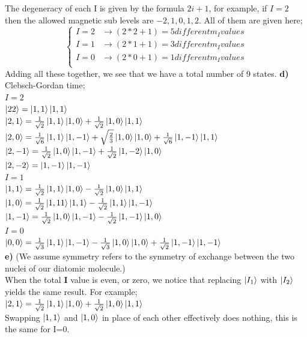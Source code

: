 \documentclass[12pt]{article}
\begin{document}
The degeneracy of each I is given by the formula $2i+1$, for example, if $I=2$ then the allowed magnetic sub levels are $-2,1,0,1,2$. All of them are given here;\\
\[
\begin{cases}
I=2 & \rightarrow(2*2+1)=5 different m_I values\\
I=1 & \rightarrow(2*1+1)=3 different m_I values\\
I=0 & \rightarrow(2*0+1)=1 different m_I values\\
\end{cases}
\]
Adding all these together, we see that we have a total number of 9 states. 
\textbf{d) } Clebsch-Gordan time;\\
$I=2$\\
$\ket{2 2}=\ket{1,1}\ket{1,1}$\\
$\ket{2,1}=\frac{1}{\sqrt{2}}\ket{1,1}\ket{1,0}+\frac{1}{\sqrt2}\ket{1,0}\ket{1,1}$\\
$\ket{2,0}=\frac{1}{\sqrt{6}}\ket{1,1}\ket{1,-1}+\sqrt{\frac{2}{3}}\ket{1,0}\ket{1,0}+\frac{1}{\sqrt{6}}\ket{1,-1}\ket{1,1}$\\
$\ket{2,-1}=\frac{1}{\sqrt{2}}\ket{1,0}\ket{1,-1}+\frac{1}{\sqrt{2}}\ket{1,-2}\ket{1,0}$\\
$\ket{2,-2}=\ket{1,-1}\ket{1,-1}$\\
$I=1$\\
$\ket{1,1}=\frac{1}{\sqrt{2}}\ket{1,1}\ket{1,0}-\frac{1}{\sqrt{2}}\ket{1,0}\ket{1,1}$\\
$\ket{1,0}=\frac{1}{\sqrt{2}}\ket{1,11}\ket{1,1}-\frac{1}{\sqrt{2}}\ket{1,1}\ket{1,-1}$\\
$\ket{1,-1}=\frac{1}{\sqrt{2}}\ket{1,0}\ket{1,-1}-\frac{1}{\sqrt{2}}\ket{1,-1}\ket{1,0}$\\
$I=0$\\
$\ket{0,0}=\frac{1}{\sqrt{3}}\ket{1,1}\ket{1,-1}-\frac{1}{\sqrt{3}}\ket{1,0}\ket{1,0}+\frac{1}{\sqrt{2}}\ket{1,-1}\ket{1,-1}$\\
\textbf{e)}  (We assume symmetry refers to the symmetry of exchange between the two nuclei of our diatomic molecule.)\\

When the total \textbf{I} value is even, or zero, we notice that replacing $\ket{I_1}$ with $\ket{I_2}$ yields the same result. For example;\\
$\ket{2,1}=\frac{1}{\sqrt{2}}\ket{1,1}\ket{1,0}+\frac{1}{\sqrt2}\ket{1,0}\ket{1,1}$\\
Swapping $\ket{1,1}$ and $\ket{1,0}$ in place of each other effectively does nothing, this is the same for I=0.\\
\end{document}
